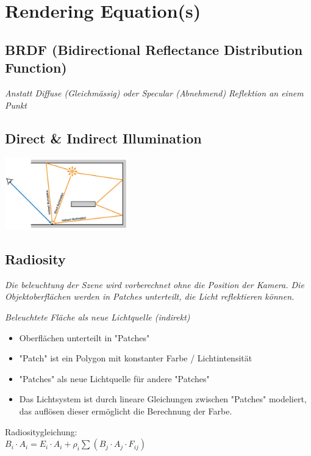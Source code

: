 \section{Rendering Equation(s)}

\subsection{BRDF (Bidirectional Reflectance Distribution Function)}

\textit{Anstatt Diffuse (Gleichmässig) oder Specular (Abnehmend) Reflektion an einem Punkt}

\subsection{Direct \& Indirect Illumination}

\includegraphics[width=0.4\textwidth]{assets/illumination.png}

\subsection{Radiosity}

\textit{Die beleuchtung der Szene wird vorberechnet ohne die Position der Kamera.
Die Objektoberflächen werden in Patches unterteilt, die Licht reflektieren können.}

\textit{Beleuchtete Fläche als neue Lichtquelle (indirekt)}

\begin{itemize}
    \item Oberflächen unterteilt in "Patches"
    \item "Patch" ist ein Polygon mit konstanter Farbe / Lichtintensität
    \item "Patches" als neue Lichtquelle für andere "Patches"
    \item Das Lichtsystem ist durch lineare Gleichungen zwischen "Patches" modeliert,
        das auflösen dieser ermöglicht die Berechnung der Farbe.
\end{itemize}

Radiositygleichung:\\
$B_i \cdot A_i = E_i \cdot A_i + \rho_i \sum(B_j \cdot A_j \cdot F_{ij})$\\

